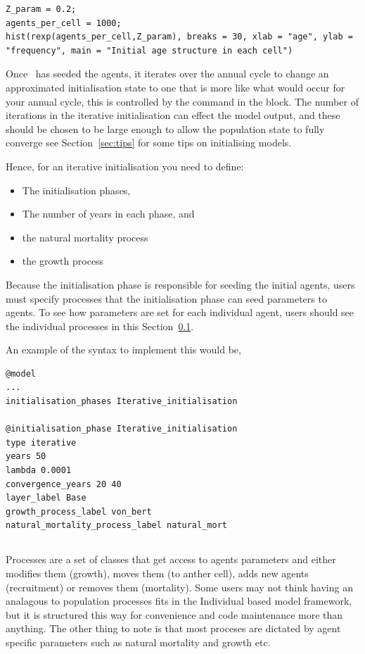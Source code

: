 \begin{lstlisting}
Z_param = 0.2;
agents_per_cell = 1000;
hist(rexp(agents_per_cell,Z_param), breaks = 30, xlab = "age", ylab = "frequency", main = "Initial age structure in each cell")
\end{lstlisting}

Once \IBM\ has seeded the agents, it iterates over the annual cycle to change an approximated initialisation state to one that is more like what would occur for your annual cycle, this is controlled by the  command in the  block. The number of iterations in the iterative initialisation can effect the model output, and these should be chosen to be large enough to allow the population state to fully converge see Section~\ref{sec:tips} for some tips on initialising models.

Hence, for an iterative initialisation you need to define:
\begin{itemize}
  \item The initialisation phases,
  \item The number of years in each phase, and
  \item the natural mortality process
  \item the growth process
\end{itemize}

Because the initialisation phase is responsible for seeding the initial agents, users must specify processes that the initialisation phase can seed parameters to agents. To see how parameters are set for each individual agent, users should see the individual processes in this Section~\ref{sec:process}.

An example of the syntax to implement this would be,
{\small{\begin{verbatim}
@model
...
initialisation_phases Iterative_initialisation

@initialisation_phase Iterative_initialisation
type iterative
years 50
lambda 0.0001
convergence_years 20 40
layer_label Base
growth_process_label von_bert
natural_mortality_process_label natural_mort
\end{verbatim}}}

\subsection{}\label{sec:process}
Processes are a set of classes that get access to agents parameters and either modifies them (growth), moves them (to anther cell), adds new agents (recruitment) or removes them (mortality). Some users may not think having an analagous to population processes fits in the Individual based model framework, but it is structured this way for convenience and code maintenance more than anything. The other thing to note is that most proceses are dictated by agent specific parameters such as natural mortality and growth etc.


